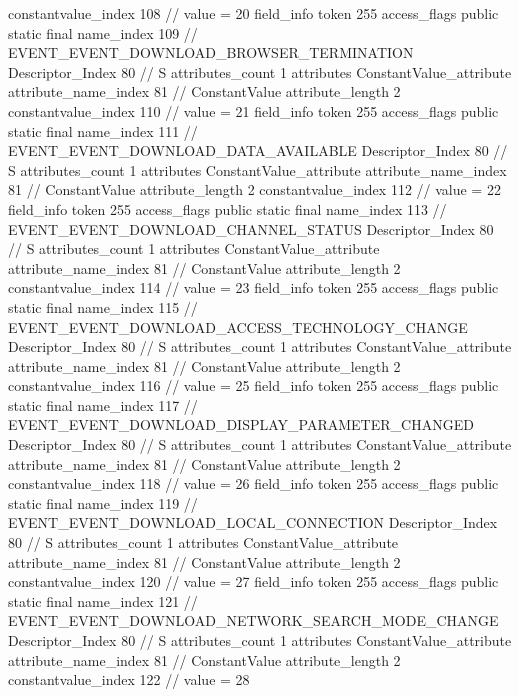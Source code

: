 {{{{{{{					constantvalue_index	108		// value = 20
				}
				}
			}
			field_info {
				token	255
				access_flags	public static final
				name_index	109		// EVENT_EVENT_DOWNLOAD_BROWSER_TERMINATION
				Descriptor_Index	80		// S
				attributes_count	1
				attributes {
				ConstantValue_attribute {
					attribute_name_index	81		// ConstantValue
					attribute_length	2
					constantvalue_index	110		// value = 21
				}
				}
			}
			field_info {
				token	255
				access_flags	public static final
				name_index	111		// EVENT_EVENT_DOWNLOAD_DATA_AVAILABLE
				Descriptor_Index	80		// S
				attributes_count	1
				attributes {
				ConstantValue_attribute {
					attribute_name_index	81		// ConstantValue
					attribute_length	2
					constantvalue_index	112		// value = 22
				}
				}
			}
			field_info {
				token	255
				access_flags	public static final
				name_index	113		// EVENT_EVENT_DOWNLOAD_CHANNEL_STATUS
				Descriptor_Index	80		// S
				attributes_count	1
				attributes {
				ConstantValue_attribute {
					attribute_name_index	81		// ConstantValue
					attribute_length	2
					constantvalue_index	114		// value = 23
				}
				}
			}
			field_info {
				token	255
				access_flags	public static final
				name_index	115		// EVENT_EVENT_DOWNLOAD_ACCESS_TECHNOLOGY_CHANGE
				Descriptor_Index	80		// S
				attributes_count	1
				attributes {
				ConstantValue_attribute {
					attribute_name_index	81		// ConstantValue
					attribute_length	2
					constantvalue_index	116		// value = 25
				}
				}
			}
			field_info {
				token	255
				access_flags	public static final
				name_index	117		// EVENT_EVENT_DOWNLOAD_DISPLAY_PARAMETER_CHANGED
				Descriptor_Index	80		// S
				attributes_count	1
				attributes {
				ConstantValue_attribute {
					attribute_name_index	81		// ConstantValue
					attribute_length	2
					constantvalue_index	118		// value = 26
				}
				}
			}
			field_info {
				token	255
				access_flags	public static final
				name_index	119		// EVENT_EVENT_DOWNLOAD_LOCAL_CONNECTION
				Descriptor_Index	80		// S
				attributes_count	1
				attributes {
				ConstantValue_attribute {
					attribute_name_index	81		// ConstantValue
					attribute_length	2
					constantvalue_index	120		// value = 27
				}
				}
			}
			field_info {
				token	255
				access_flags	public static final
				name_index	121		// EVENT_EVENT_DOWNLOAD_NETWORK_SEARCH_MODE_CHANGE
				Descriptor_Index	80		// S
				attributes_count	1
				attributes {
				ConstantValue_attribute {
					attribute_name_index	81		// ConstantValue
					attribute_length	2
					constantvalue_index	122		// value = 28
				}
				}
}}}}}
